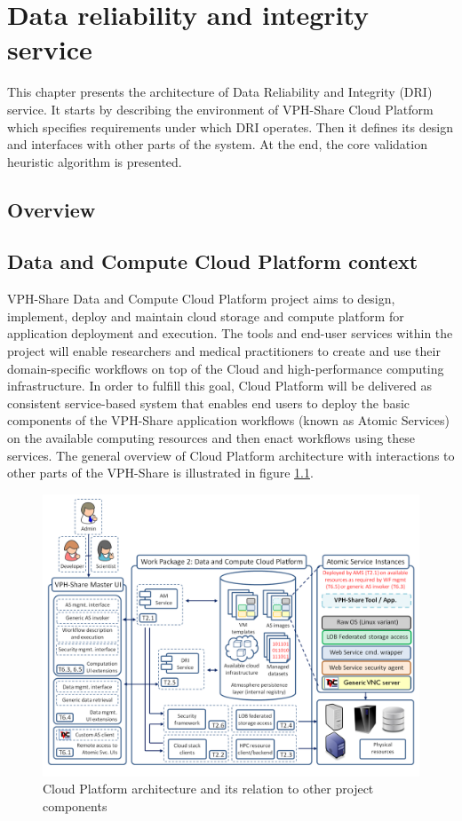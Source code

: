 \chapter{Data reliability and integrity service}
\label{cha:architecture}
This chapter presents the architecture of Data Reliability and Integrity (DRI)
service. It starts by describing the environment of VPH-Share Cloud Platform 
which specifies requirements under which DRI operates. Then it defines its 
design and interfaces with other parts of the system. At the end, the core 
validation heuristic algorithm is presented.

	\section{Overview}

	\section{Data and Compute Cloud Platform context}
	\label{cloud-platform}
VPH-Share Data and Compute Cloud Platform project aims to design, implement,
deploy and maintain cloud storage and compute platform for application deployment
and execution. The tools and end-user services within the project will enable
researchers and medical practitioners to create and use their domain-specific
workflows on top of the Cloud and high-performance computing infrastructure.
In order to fulfill this goal, Cloud Platform will be delivered as consistent
service-based system that enables end users to deploy the basic components of
the VPH-Share application workflows (known as Atomic Services) on the available
computing resources and then enact workflows using these services. The general
overview of Cloud Platform architecture with interactions to other parts of
the VPH-Share is illustrated in figure \ref{fig:vph-architecture}.

\begin{figure}[h!]
	\centering
	\includegraphics[width=\textwidth]{images/vph-architecture.png}
	\caption{Cloud Platform architecture and its relation to other project
	components}
	\label{fig:vph-architecture}
\end{figure}


